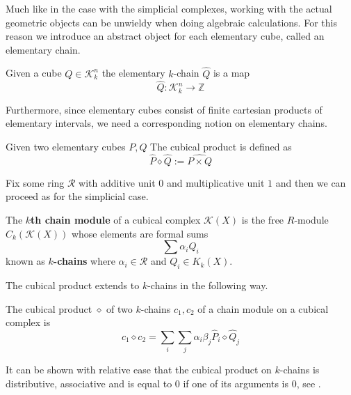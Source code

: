 \begin{example}
Much like in the case with the simplicial complexes, working with the actual geometric objects can be unwieldy when doing algebraic calculations. For this reason we introduce an abstract object for each elementary cube, called an elementary chain.
\begin{definition}
  Given a cube $Q \in \mathcal{K}^{n}_{k}$ the elementary $k$-chain $\hat Q$ is a map
  \[\hat Q: \mathcal{K}^{n}_{k} \to \mathbb{Z}\]
\end{definition}

Furthermore, since elementary cubes consist of finite cartesian products of elementary intervals, we need a corresponding notion on elementary chains.

\begin{definition}
Given two elementary cubes $P,Q$ The cubical product is defined as \[\hat P \diamond \hat Q:= \widehat{P \times Q}\]
\end{definition}
Fix some ring $\mathcal{R}$ with additive unit $0$ and multiplicative unit $1$ and then we can proceed as for the simplicial case.
\begin{definition}
  The \textbf{$k$th chain module} of a cubical complex $\mathcal{K}(X)$ is the free $R$-module $C_{k}(\mathcal{K}(X))$ whose elements are formal sums
  \[ \sum \alpha_{i} Q_{i}\]
  known as \textbf{$k$-chains} where $\alpha_{i} \in \mathcal{R}$ and $Q_{i} \in K_{k}(X)$.
\end{definition}

The cubical product extends to $k$-chains in the following way.

\begin{definition}
The cubical product $\diamond$ of two $k$-chains $c_{1},c_{2}$ of a chain module on a cubical complex is \[ c_{1} \diamond c_{2} = \sum_{i} \sum_{j} \alpha_{i} \beta_{j} \hat P_{i} \diamond  \hat Q_{j}\]
\end{definition}

It can be shown with relative ease that the cubical product on $k$-chains is distributive, associative and is equal to 0 if one of its arguments is 0, see \cite[Proposition 2.25, p. ~51]{kaczynski2004}.


\end{example}
